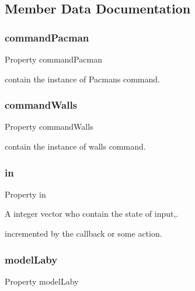 \subsection{Member Data Documentation}
\mbox{\label{class_wrapper_ab39f6156efa48a09b1d92e22eb9fc94a}} 
\subsubsection{\texorpdfstring{command\+Pacman}{commandPacman}}
{\footnotesize\ttfamily Property command\+Pacman}



contain the instance of Pacman\textquotesingle{}s command. 

\mbox{\label{class_wrapper_ae0183c9714a832124ccb420d5f9d3c1f}} 
\subsubsection{\texorpdfstring{command\+Walls}{commandWalls}}
{\footnotesize\ttfamily Property command\+Walls}



contain the instance of wall\textquotesingle{}s command. 

\mbox{\label{class_wrapper_a5e252d97ca5bf85c5753e2914673eead}} 
\subsubsection{\texorpdfstring{in}{in}}
{\footnotesize\ttfamily Property in}



A integer vector who contain the state of input,. 

incremented by the callback or some action. \mbox{\label{class_wrapper_a65b2390d6d3e36b42ee0ea886a562d5c}} 
\subsubsection{\texorpdfstring{model\+Laby}{modelLaby}}
{\footnotesize\ttfamily Property model\+Laby}



